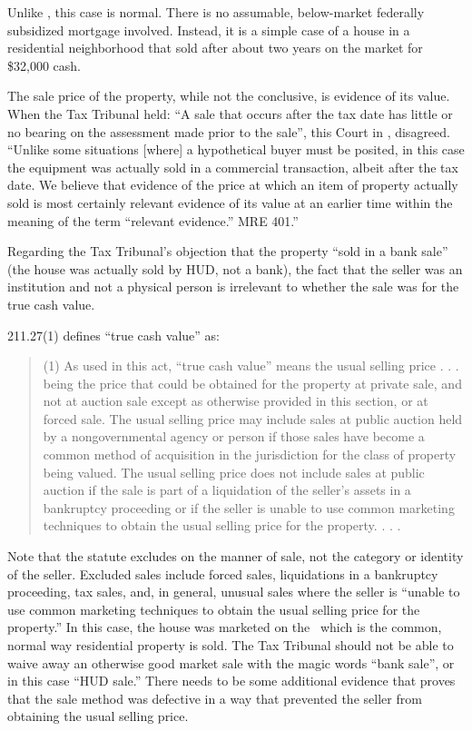 \documentclass[12pt,\documentclassflag]{michiganCourtOfAppealsBrief}
\begin{document}
{Unlike \cite[s]{Antisdale}, this case is normal. There is no assumable, below-market federally subsidized mortgage involved. Instead, it is a simple case of a house in a residential neighborhood that sold after about two years on the market for \$32,000 cash.

The sale price of the property, while not the conclusive, is evidence of its value. When the Tax Tribunal held: ``A sale that occurs after the tax date has little or no bearing on the assessment made prior to the sale'', this Court in , disagreed. ``Unlike some situations [where] a hypothetical buyer must be posited, in this case the equipment was actually sold in a commercial transaction, albeit after the tax date. We believe that evidence of the price at which an item of property actually sold is most certainly relevant evidence of its value at an earlier time within the meaning of the term ``relevant evidence.'' MRE 401.''

Regarding the Tax Tribunal's objection that the property ``sold in a bank sale'' (the house was actually sold by HUD, not a bank), the fact that the seller was an institution and not a physical person is irrelevant to whether the sale was for the true cash value.

\cite{MCL}{211.27(1)} defines ``true cash value'' as:

\begin{quote}
  (1) As used in this act, ``true cash value'' means the usual selling price . . . being the price that could be obtained for the property at private sale, and not at auction sale except as otherwise provided in this section, or at forced sale. The usual selling price may include sales at public auction held by a nongovernmental agency or person if those sales have become a common method of acquisition in the jurisdiction for the class of property being valued. The usual selling price does not include sales at public auction if the sale is part of a liquidation of the seller's assets in a bankruptcy proceeding or if the seller is unable to use common marketing techniques to obtain the usual selling price for the property. . . . 
\end{quote}

Note that the statute excludes on the manner of sale, not the category or identity of the seller. Excluded sales include forced sales, liquidations in a bankruptcy proceeding, tax sales, and, in general, unusual sales where the seller is ``unable to use common marketing techniques to obtain the usual selling price for the property.'' In this case, the house was marketed on the \MLS\ which is the common, normal way residential property is sold. The Tax Tribunal should not be able to waive away an otherwise good market sale with the magic words ``bank sale'', or in this case ``HUD sale.'' There needs to be some additional evidence that proves that the sale method was defective in a way that prevented the seller from obtaining the usual selling price.

}
\end{document}
